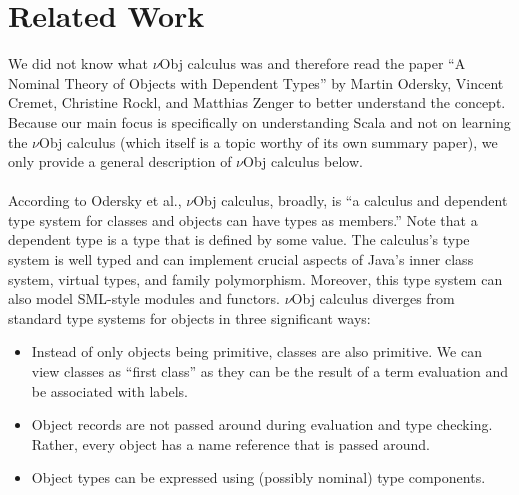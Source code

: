 \documentclass[jou,apacite]{IEEEtran}
\begin{document}
\section{Related Work}
  \label{sec:related-work}
  We did not know what $\nu$Obj calculus was and therefore read the paper “A Nominal Theory of Objects with Dependent Types” by Martin Odersky, Vincent Cremet, Christine Rockl, and Matthias Zenger to better understand the concept. Because our main focus is specifically on understanding Scala and not on learning the $\nu$Obj calculus (which itself is a topic worthy of its own summary paper), we only provide a general description of $\nu$Obj calculus below.\\\\
  According to Odersky et al., $\nu$Obj calculus, broadly, is “a calculus and dependent type system for classes and objects can have types as members.” Note that a dependent type is a type that is defined by some value. The calculus’s type system is well typed and can implement crucial aspects of Java’s inner class system, virtual types, and family polymorphism. Moreover, this type system can also model SML-style modules and functors. $\nu$Obj calculus diverges from standard type systems for objects in three significant ways:
  \begin{itemize}
    \item Instead of only objects being primitive, classes are also  primitive. We can view classes as “first class” as they can be the result of a term evaluation and be associated with labels.
    \item Object records are not passed around during evaluation and type checking. Rather, every object has a name reference that is passed around.
    \item Object types can be expressed using (possibly nominal) type components.
  \end{itemize}
  
\end{document}
